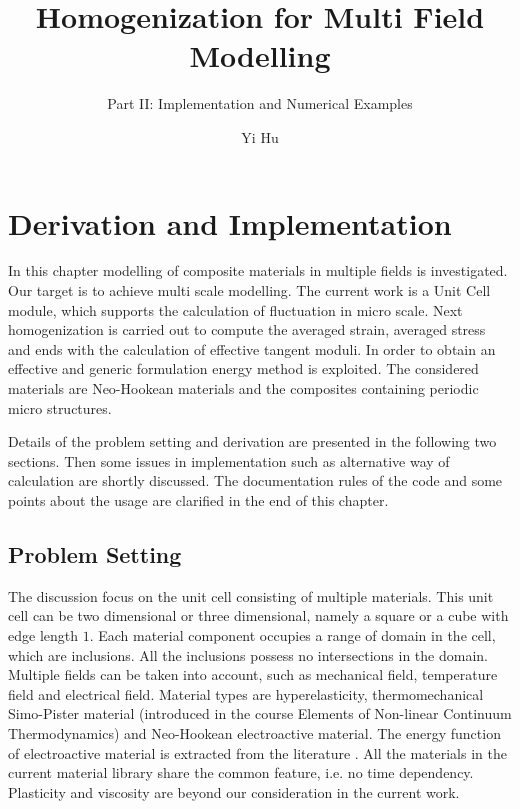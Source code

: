 \documentclass[10pt,a4paper]{scrreprt}
\author{Yi Hu}
\title{Homogenization for Multi Field Modelling}
\subtitle{Part II: Implementation and Numerical Examples}
\begin{document}
\chapter{Derivation and Implementation}
In this chapter modelling of composite materials in multiple fields is investigated. Our target is to achieve multi scale modelling. The current work is a Unit Cell module, which supports the calculation of fluctuation in micro scale. Next homogenization is carried out to compute the averaged strain, averaged stress and ends with the calculation of effective tangent moduli. In order to obtain an effective and generic formulation energy method is exploited. The considered materials are Neo-Hookean materials and the composites containing periodic micro structures.

Details of the problem setting and derivation are presented in the following two sections. Then some issues in implementation such as alternative way of calculation are shortly discussed. The documentation rules of the code and some points about the usage are clarified in the end of this chapter.

\section{Problem Setting}
The discussion focus on the unit cell consisting of multiple materials. This unit cell can be two dimensional or three dimensional, namely a square or a cube with edge length $1$. Each material component occupies a range of domain in the cell, which are inclusions. All the inclusions possess no intersections in the domain. Multiple fields can be taken into account, such as mechanical field, temperature field and electrical field. Material types are hyperelasticity, thermomechanical Simo-Pister material (introduced in the course Elements of Non-linear Continuum Thermodynamics) and Neo-Hookean electroactive material. The energy function of electroactive material is extracted from the literature \citep{keip_two-scale_2014}. All the materials in the current material library share the common feature, i.e. no time dependency. Plasticity and viscosity are beyond our consideration in the current work.
\end{document}
